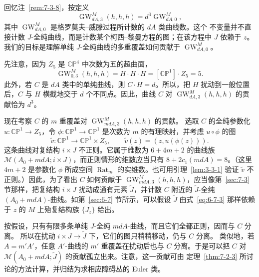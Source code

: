 回忆注~\ref{rem:7-3-8}，按定义
\[
  \operatorname{GW}_{dA,3}^M(h,h,h)
  =d^3\operatorname{GW}_{dA,0}^M,
\]
其中 $\operatorname{GW}_{dA,0}^M$ 是格罗莫夫--威滕过程所计数的 $dA$ 类曲线数。这个
不变量并不直接计数 $J$-全纯曲线，而是计数某个柯西--黎曼方程的图；在该方程中 $J$
依赖于 $z$。我们的目标是理解单纯 $J$-全纯曲线的多重覆盖如何贡献于
$\operatorname{GW}_{dA,0}^M$。

先注意，因为 $Z_5$ 是 $\mathbb{CP}^4$ 中次数为五的超曲面，
\[
  \operatorname{GW}_{0,3}^M(h,h,h)
  =H\cdot H\cdot H=[\mathbb{CP}^1]\cdot Z_5=5.
\]
此外，若 $C$ 是 $dA$ 类中的单纯曲线，则 $C\cdot H=d$。所以，把 $H$ 扰动到一般位置
后，$C$ 与 $H$ 横截地交于 $d$ 个不同点。因此，曲线 $C$ 对
$\operatorname{GW}_{dA,3}^M(h,h,h)$ 的贡献恰为 $d^3$。

现在考察 $C$ 的 $m$ 重覆盖对 $\operatorname{GW}_{mdA,3}^M(h,h,h)$ 的贡献。
选取 $C$
的全纯参数化 $u:\mathbb{CP}^1\to Z_5$，令
$\phi:\mathbb{CP}^1\to\mathbb{CP}^1$ 是次数为 $m$ 的有理映射，并考虑 $u\circ\phi$
的图
\[
  \widetilde v:\mathbb{CP}^1\longrightarrow\mathbb{CP}^1\times Z_5,
  \qquad
  \widetilde v(z)=(z,u(\phi(z))).
\]
这条曲线对复结构 $i\times J$ 不正则。它属于维数为 $6+4m+2$ 的曲线族
$\mathcal M(A_0+mdA;i\times J)$，而正则情形的维数应当只有
$8+2c_1(mdA)=8$。（这里 $4m+2$ 是参数化 $\phi$ 所成空间
$\operatorname{Rat}_m$ 的实维数。也可用引理~\ref{lem:3-3-1} 验证
$\widetilde v$ 不正则。）因此，为了看出 $C$ 如何贡献于
$\operatorname{GW}_{mdA,3}^M(h,h,h)$，应当像第~\ref{sec:7-3} 节那样，把复结构
$i\times J$ 扰动成通有元素 $\widetilde J$，并计数 $C$ 附近的
$\widetilde J$-全纯 $(A_0+mdA)$-曲线。如第~\ref{sec:6-7} 节所示，可以假设
$\widetilde J$ 由式~\eqref{eq:6-7-3} 那样依赖于 $z$ 的 $M$ 上殆复结构族 $\{J_z\}$ 给出。

按假设，只有有限多条单纯 $J$-全纯 $mdA$-曲线，而且它们全都正则，因而与 $C$ 分离。
所以在扰动 $i\times J\to\widetilde J$ 下，它们的图只稍稍移动，仍与 $C$ 分离。
类似地，若 $A=m'A'$，任意 $A'$-曲线的 $m'$ 重覆盖在扰动后也与 $C$ 分离。于是可以把
$C$ 对 $\mathcal M(A_0+mdA;\widetilde J)$ 的贡献孤立出来。注意，这一贡献可由
定理~\ref{thm:7-2-3} 所讨论的方法计算，并归结为求相应障碍丛的 Euler 类。

